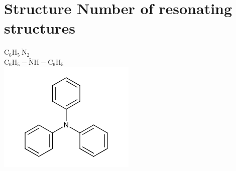 \documentclass[10pt]{article}
\begin{document}
\section*{Structure Number of resonating structures}
$\mathrm{C}_{6} \mathrm{H}_{5} \ddot{\mathrm{~N}}_{2}$\\
$\mathrm{C}_{6} \mathrm{H}_{5}-\ddot{\mathrm{N}} \mathrm{H}-\mathrm{C}_{6} \mathrm{H}_{5}$\\
\includegraphics{smile-862275865ae2fcb2cc4c0880dbb5266fd0fd6af1}\\
\end{document}
